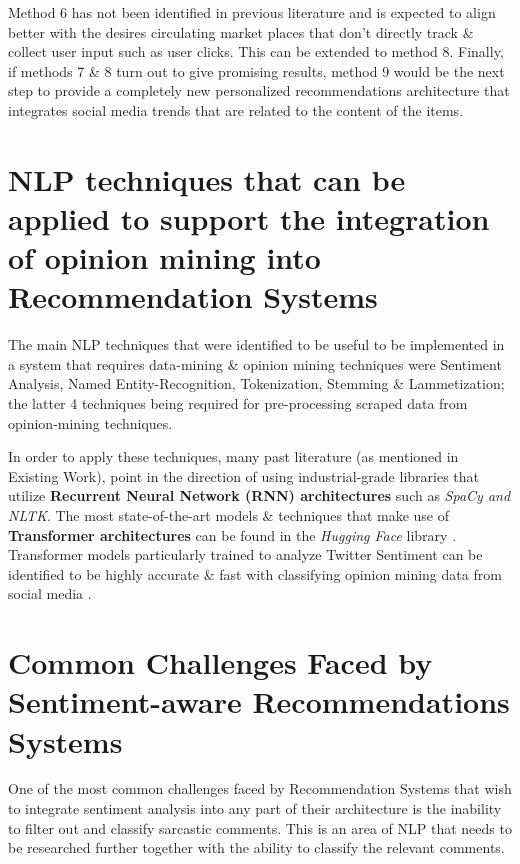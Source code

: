 \documentclass[manuscript,screen,natbib=false]{acmart}
\begin{document}
Method 6 has not been identified in previous literature and is expected to align better with the desires circulating market places that don't directly track \& collect user input such as user clicks. This can be extended to method 8. Finally, if methods 7 \& 8 turn out to give promising results, method 9 would be the next step to provide a completely new personalized recommendations architecture that integrates social media trends that are related to the content of the items.

\section{NLP techniques that can be applied to support the integration of opinion mining into Recommendation Systems}

The main NLP techniques that were identified to be useful to be implemented in a system that requires data-mining \& opinion mining techniques were Sentiment Analysis, Named Entity-Recognition, Tokenization, Stemming \& Lammetization; the latter 4 techniques being required for pre-processing scraped data from opinion-mining techniques.

In order to apply these techniques, many past literature (as mentioned in Existing Work), point in the direction of using industrial-grade libraries that utilize \textbf{Recurrent Neural Network (RNN) architectures} such as \textit{SpaCy and NLTK}. The most state-of-the-art models \& techniques that make use of \textbf{Transformer architectures} can be found in the \textit{Hugging Face} library \cite{wolf_transformers_2020}. Transformer models particularly trained to analyze Twitter Sentiment can be identified to be highly accurate \& fast with classifying opinion mining data from social media \cite{noauthor_cardiffnlptwitter-roberta-base-sentiment_nodate, barbieri_tweeteval_2020}.

\section{Common Challenges Faced by Sentiment-aware Recommendations Systems}
One of the most common challenges faced by Recommendation Systems that wish to integrate sentiment analysis into any part of their architecture is the inability to filter out and classify sarcastic comments. This is an area of NLP that needs to be researched further together with the ability to classify the relevant comments.
\end{document}
